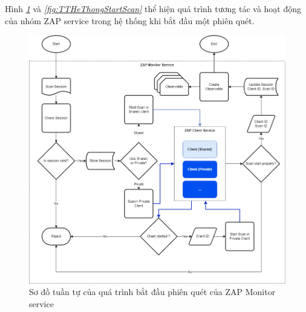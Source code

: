 Hình \textit{\ref{fig:TTZapMonitorStartScan} } và \textit{\ref{fig:TTHeThongStartScan} } thể hiện quá trình tương tác và hoạt động của nhóm ZAP service trong hệ thống khi bắt đầu một phiên quét.

\begin{figure}[H]
      \centering
      \includegraphics[width=\textwidth]{applied-thesis-chapters/chapter-3/Sơ đồ tuần tự của quá trình bắt đầu phiên quét của ZAP Monitor service.png}
      \caption{Sơ đồ tuần tự của quá trình bắt đầu phiên quét của ZAP Monitor service}
      \label{fig:TTZapMonitorStartScan}
\end{figure}

